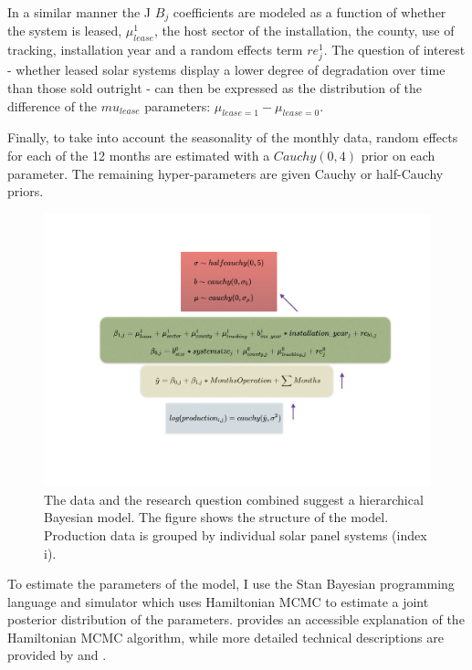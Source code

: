 \documentclass[12pt]{article}
\begin{document}
In a similar manner the J $B_j$ coefficients are modeled as a function of whether the system is leased, $\mu_{lease}^1$, the host sector of the installation, the county, use of tracking, installation year and a random effects term $re^1_j$.  The question of interest - whether leased solar systems display a lower degree of degradation over time than those sold outright - can then be expressed as the distribution of the difference of the $mu_{lease}$ parameters: $\mu_{lease=1} - \mu_{lease=0}$.

Finally, to take into account the seasonality of the monthly data, random effects for each of the 12 months are estimated with a $Cauchy(0,4)$ prior on each parameter. The remaining hyper-parameters are given Cauchy or half-Cauchy priors. 

\begin{figure}
	\includegraphics[width=1\textwidth]{figures/solar_prod_bayes_diag.png}
	\caption{The data and the research question combined suggest a hierarchical Bayesian model. The figure shows the structure of the model. Production data is grouped by individual solar panel systems (index i).}
	\label{solar_prod_bayes_diag}
\end{figure}

To estimate the parameters of the model, I use the Stan Bayesian programming language and simulator \citep{stan_development_team_stan_2014} which uses Hamiltonian MCMC to estimate a joint posterior distribution of the parameters. \citet{kruschke_doing_2014} provides an accessible explanation of the Hamiltonian MCMC algorithm, while more detailed technical descriptions are provided by \citet{gelman_bayesian_2013} and \citet{stan_development_team_stan_2014}.
\end{document}
